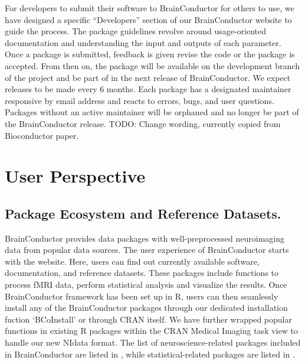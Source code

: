 \documentclass{nature}
\begin{document}
For developers to submit their software to BrainConductor for others to use,
we have designed a specific ``Developers'' section of our BrainConductor website
to guide the process. The package guidelines revolve around usage-oriented
documentation and understanding the input and outputs of each parameter.
 Once 
a package is submitted, feedback is given revise the code or the package is
accepted.
From then on, the package will be available on the
development branch of the project and be part of in the next release of
BrainConductor.
We expect releases to be made every 6 months.
Each package has a designated maintainer responsive by email address and reacts
to
errors, bugs, and user questions. Packages without an active maintainer will be
orphaned and no longer be part of the BrainConductor release.
{\color{red}TODO: Change wording, currently copied from Bioconductor paper.}


\section{User Perspective}


\subsection{Package Ecosystem and Reference Datasets.}
BrainConductor provides data packages with well-preprocessed neuroimaging data
from popular data sources.
The user experience of BrainConductor starts with the website. Here, users can 
find out currently available software, documentation, and reference datasets.
These packages include functions to process fMRI data, perform statistical
analysis and visualize the results.
Once BrainConductor framework has been set up in R, users can then
seamlessly install any of the BrainConductor packages through our
dedicated installation fuction `BCoInstall' or through CRAN itself.
We have further wrapped popular functions in existing R packages
within the CRAN Medical Imaging task view to handle our new NIdata format.
The list of neuroscience-related packages included in BrainConductor are listed 
in , while statistical-related packages are listed in
.
\end{document}
